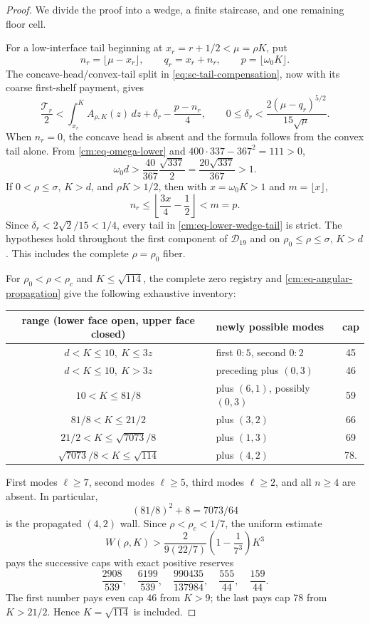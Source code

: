 \documentclass[11pt]{article}
\numberwithin{equation}{section}
\theoremstyle{definition}
\theoremstyle{remark}
\begin{document}
\begin{proof}
We divide the proof into a wedge, a finite staircase, and one remaining
floor cell.

For a low-interface tail beginning at \(x_r=r+1/2<\mu=\rho K\), put
\[
 n_r=\lfloor\mu-x_r\rfloor,\qquad
 q_r=x_r+n_r,\qquad p=\lfloor\omega_0K\rfloor.
\]
The concave-head/convex-tail split in
\eqref{eq:sc-tail-compensation}, now with its coarse first-shelf payment,
gives
\begin{equation}
 \frac{\mathcal T_r}{2}
 <\int_{x_r}^K A_{\rho,K}(z)\,dz
 +\delta_r-\frac{p-n_r}{4},
 \qquad
 0\leq\delta_r<
 \frac{2(\mu-q_r)^{5/2}}{15\sqrt\mu}.
 \label{cm:eq-lower-wedge-tail}
\end{equation}
When \(n_r=0\), the concave head is absent and the formula follows from
the convex tail alone.  From \eqref{cm:eq-omega-lower} and
\(400\cdot337-367^2=111>0\),
\[
 \omega_0d>
 \frac{40}{367}\frac{\sqrt{337}}2
 =\frac{20\sqrt{337}}{367}>1.
\]
If
\(0<\rho\leq\sigma\), \(K>d\), and \(\rho K>1/2\), then with
\(x=\omega_0K>1\) and \(m=\lfloor x\rfloor\),
\[
 n_r\leq\left\lfloor\frac{3x}{4}-\frac12\right\rfloor<m=p.
\]
Since \(\delta_r<2\sqrt2/15<1/4\), every tail in
\eqref{cm:eq-lower-wedge-tail} is strict.  The hypotheses hold throughout
the first component of \(\mathcal D_{19}\) and on
\(\rho_0\leq\rho\leq\sigma\), \(K>d\).  This includes the complete
\(\rho=\rho_0\) fiber.

For \(\rho_0<\rho<\rho_c\) and \(K\leq\sqrt{114}\), the complete zero
registry and \eqref{cm:eq-angular-propagation} give the following exhaustive
inventory:
\begin{center}
\small
\begin{tabular}{c|l|c}
range (lower face open, upper face closed)&newly possible modes&cap\\ \hline
\(d<K\leq10,\ K\leq3z\)&first \(0{:}5\), second \(0{:}2\)&45\\
\(d<K\leq10,\ K>3z\)&preceding plus \((0,3)\)&46\\
\(10<K\leq81/8\)&plus \((6,1)\), possibly \((0,3)\)&59\\
\(81/8<K\leq21/2\)&plus \((3,2)\)&66\\
\(21/2<K\leq\sqrt{7073}/8\)&plus \((1,3)\)&69\\
\(\sqrt{7073}/8<K\leq\sqrt{114}\)&plus \((4,2)\)&78.
\end{tabular}
\end{center}
First modes \(\ell\geq7\), second modes \(\ell\geq5\), third modes
\(\ell\geq2\), and all \(n\geq4\) are absent.  In particular,
\[
 (81/8)^2+8=7073/64
\]
is the propagated \((4,2)\) wall.  Since \(\rho<\rho_c<1/7\), the
uniform estimate
\[
 W(\rho,K)>
 \frac{2}{9(22/7)}\left(1-\frac1{7^3}\right)K^3
\]
pays the successive caps with exact positive reserves
\[
 \frac{2908}{539},\quad\frac{6199}{539},\quad
 \frac{990435}{137984},\quad\frac{555}{44},\quad\frac{159}{44}.
\]
The first number pays even cap \(46\) from \(K>9\); the last pays cap
\(78\) from \(K>21/2\).  Hence \(K=\sqrt{114}\) is included.


\end{proof}
\end{document}
